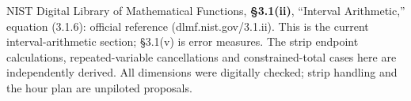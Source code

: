 NIST Digital Library of Mathematical Functions, \textbf{\S3.1(ii)}, ``Interval Arithmetic,'' equation (3.1.6): official reference (dlmf.nist.gov/3.1.ii). This is the current interval-arithmetic section; \S3.1(v) is error measures. The strip endpoint calculations, repeated-variable cancellations and constrained-total cases here are independently derived. All dimensions were digitally checked; strip handling and the hour plan are unpiloted proposals.
